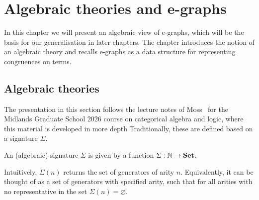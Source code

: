 \chapter{Algebraic theories and e-graphs}\label{chapter:algebras}

In this chapter we will present an algebraic view of e-graphs, which will be the basis for our generalisation in later chapters.
The chapter introduces the notion of an algebraic theory and recalls e-graphs as a data structure for representing congruences on terms.
\section{Algebraic theories}
The presentation in this section follows the lecture notes of Moss~\cite{mossCategoricalAlgebraLogica} for the Midlands Graduate School 2026 course on categorical algebra and logic, where this material is developed in more depth
Traditionally, these are defined based on a signature $\Sigma$.
\begin{definition}
An (algebraic) signature $\Sigma$ is given by a function $\Sigma : \mathbb{N} \to \mathbf{Set}$.
\end{definition}

Intuitively, $\Sigma(n)$ returns the set of generators of arity $n$.
Equivalently, it can be thought of as a set of generators with specified arity, such that for all arities with no representative in the set $\Sigma(n) = \varnothing$.

